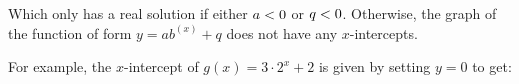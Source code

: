           
          \label{m39348*id252022}Which only has a real solution if either \begin{math}a<{}0\end{math} or \begin{math}q<{}0\end{math}. Otherwise, the graph of the function of form \begin{math}y=a{b}^{\left(x\right)}+q\end{math} does not have any \begin{math}x\end{math}-intercepts.\par 
          \label{m39348*id252098}For example, the \begin{math}x\end{math}-intercept of \begin{math}g\left(x\right)=3\ensuremath{\cdot}{2}^{x}+2\end{math} is given by setting \begin{math}y=0\end{math} to get:\par 
          \label{m39348*id252162}\nopagebreak\noindent{}
